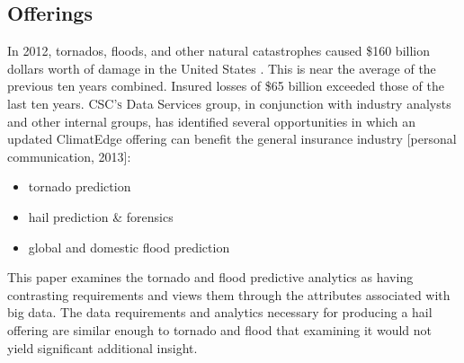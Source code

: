 \subsection{Offerings}
In 2012, tornados, floods, and other natural catastrophes caused \$160  billion dollars worth of damage in the United States \cite{stalder}. This is near the average of the previous ten years combined. Insured losses of \$65 billion exceeded those of the last ten years. \textsc{CSC's} Data Services group, in conjunction with industry analysts and other internal groups, has identified several opportunities  in which an updated ClimatEdge offering can benefit the general insurance industry [personal communication, 2013]:
\begin{itemize}
    \item tornado prediction
    \item hail prediction \& forensics
    \item global and domestic flood prediction
\end{itemize}
This paper examines the tornado and flood predictive analytics as having contrasting requirements and views them through the attributes associated with big data. The data requirements and analytics necessary for producing a hail offering are similar enough to tornado and flood that examining it would not yield significant additional insight.
